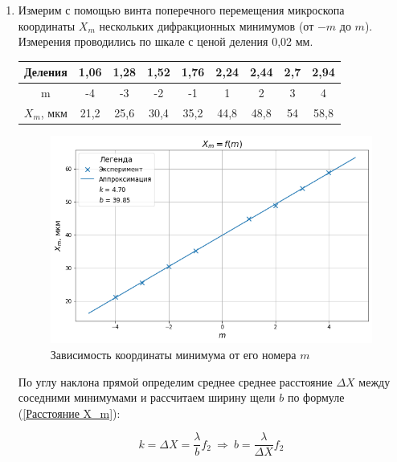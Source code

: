 \documentclass[a4paper, 12pt]{article}
\begin{document}
\begin{enumerate}
	\item Измерим с помощью винта поперечного перемещения микроскопа координаты $X_m$ нескольких дифракционных минимумов (от $-m$ до $m$). Измерения проводились по шкале с ценой деления 0,02 мм.

	\begin{center}
		\begin{tabular}{|c|c|c|c|c|c|c|c|c|}
			\hline
			Деления   & 1,06 & 1,28 & 1,52 & 1,76 & 2,24 & 2,44 & 2,7 & 2,94 \\ \hline
			m         & -4   & -3   & -2   & -1   & 1    & 2    & 3   & 4    \\ \hline
			$X_m$, мкм & 21,2 & 25,6 & 30,4 & 35,2 & 44,8 & 48,8 & 54  & 58,8 \\ \hline
		\end{tabular}
	\end{center}

	\begin{figure}[h!]
		\begin{center}
		\includegraphics[width=1\textwidth]{graph2.png}
		\caption{Зависимость координаты минимума от его номера $m$}
		\label{График_ширина(номер)}
		\end{center}
	\end{figure}

	По углу наклона прямой определим среднее среднее расстояние $\Delta X$ между соседними минимумами и рассчитаем ширину щели $b$ по формуле (\ref{Расстояние X_m}):

\[k = \Delta X = \dfrac{\lambda}{b}f_2~\Rightarrow~b=\dfrac{\lambda}{\Delta X}f_2\]


\end{enumerate}
\end{document}
